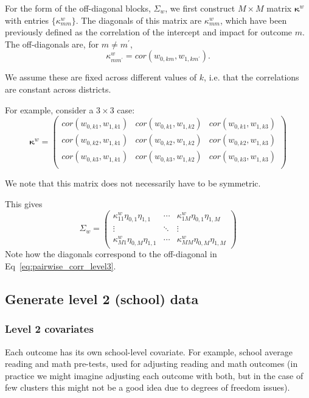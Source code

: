 \documentclass[12pt]{article}
\begin{document}
For the form of the off-diagonal blocks, $\Sigma_{w}$, we first construct $M \times M$ matrix $\boldsymbol{\kappa}^{w}$ with entries $\{\kappa^{w}_{mm}\}$. 
The diagonals of this matrix are $\kappa^{w}_{mm}$, which have been previously defined as the correlation of the intercept and impact for outcome $m$.
The off-diagonals are, for $m \neq m^\prime$,
\[ \kappa^{w}_{m m^\prime} = cor( w_{0,km}, w_{1,km^\prime} ) .\]

We assume these are fixed across different values of $k$, i.e. that the correlations are constant across districts.

For example, consider a $3 \times 3$ case:
\[ \boldsymbol{\kappa}^{w} =
\left(
\begin{array}{ccc}
cor( w_{0,k1}, w_{1,k1} )	& cor( w_{0,k1}, w_{1,k2} ) & cor( w_{0,k1}, w_{1,k3} ) \\
cor( w_{0,k2}, w_{1,k1} )	& cor( w_{0,k2}, w_{1,k2} ) & cor( w_{0,k2}, w_{1,k3} ) \\
cor( w_{0,k3}, w_{1,k1} )	& cor( w_{0,k3}, w_{1,k2} ) & cor( w_{0,k3}, w_{1,k3} ) \\
\end{array}
\right)
\]

We note that this matrix does not necessarily have to be symmetric. 

This gives 
\[ \Sigma_{w} =
\left(
\begin{array}{ccc}
\kappa^{w}_{11} \eta_{0,1} \eta_{1,1} 	& \cdots & \kappa^{w}_{1M} \eta_{0,1}\eta_{1,M} \\
\vdots 									& \ddots & \vdots 							\\
\kappa^{w}_{M1} \eta_{0,M} \eta_{1,1} 	& \cdots & \kappa^{w}_{MM} \eta_{0,M}\eta_{1,M}
\end{array}
\right)
\]
Note how the diagonals correspond to the off-diagonal in Eq~\ref{eq:pairwise_corr_level3}.


\subsection{Generate level 2 (school) data}

\subsubsection{Level 2 covariates}

Each outcome has its own school-level covariate.
For example, school average reading and math pre-tests, used for adjusting reading and math outcomes (in practice we might imagine adjusting each outcome with both, but in the case of few clusters this might not be a good idea due to degrees of freedom issues).
\end{document}
